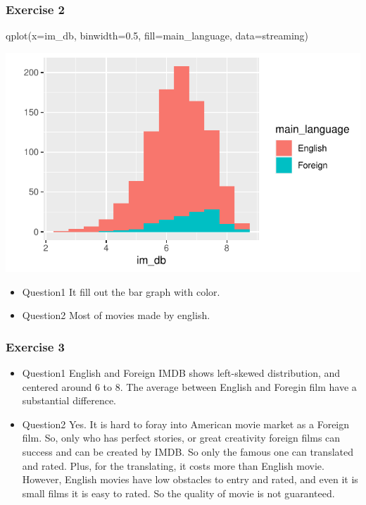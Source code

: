 \documentclass[
  11pt,
]{article}
\newenvironment{Shaded}{\begin{snugshade}}{\end{snugshade}}
\newcommand{\AttributeTok}[1]{\textcolor[rgb]{0.77,0.63,0.00}{#1}}
\newcommand{\FloatTok}[1]{\textcolor[rgb]{0.00,0.00,0.81}{#1}}
\newcommand{\FunctionTok}[1]{\textcolor[rgb]{0.00,0.00,0.00}{#1}}
\newcommand{\NormalTok}[1]{#1}
\begin{document}
\hypertarget{exercise-2}{%
\subsubsection{Exercise 2}\label{exercise-2}}

\begin{Shaded}
\begin{Highlighting}[]
\FunctionTok{qplot}\NormalTok{(}\AttributeTok{x=}\NormalTok{im\_db, }\AttributeTok{binwidth=}\FloatTok{0.5}\NormalTok{, }\AttributeTok{fill=}\NormalTok{main\_language, }\AttributeTok{data=}\NormalTok{streaming)}
\end{Highlighting}
\end{Shaded}

\begin{center}\includegraphics[width=0.8\linewidth]{lab02_files/figure-latex/unnamed-chunk-2-1} \end{center}

\begin{itemize}
\item
  Question1 It fill out the bar graph with color.
\item
  Question2 Most of movies made by english.
\end{itemize}

\hypertarget{exercise-3}{%
\subsubsection{Exercise 3}\label{exercise-3}}

\begin{itemize}
\item
  Question1 English and Foreign IMDB shows left-skewed distribution, and
  centered around 6 to 8. The average between English and Foregin film
  have a substantial difference.
\item
  Question2 Yes. It is hard to foray into American movie market as a
  Foreign film. So, only who has perfect stories, or great creativity
  foreign films can success and can be created by IMDB. So only the
  famous one can translated and rated. Plus, for the translating, it
  costs more than English movie. However, English movies have low
  obstacles to entry and rated, and even it is small films it is easy to
  rated. So the quality of movie is not guaranteed.
\end{itemize}
\end{document}
